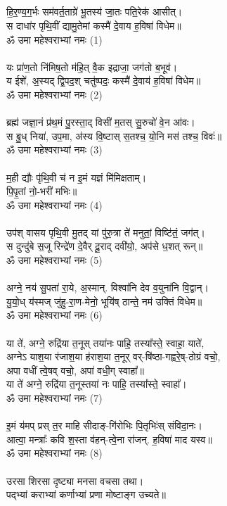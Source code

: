 \subsection{}
हि॒र॒ण्य॒ग॒र्भः सम॑वर्त॒ताग्रे॑ भू॒तस्य॑ जा॒तः पति॒रेक॑ आसीत्।\\
स दाधा॑र पृथि॒वीं द्यामु॒तेमां कस्मै॑ दे॒वाय ह॒विषा॑ विधेम॥\\
ॐ उमा महेश्वराभ्यां नमः     (1)\\
\\
यः प्रा॑ण॒तो नि॑मिष॒तो म॑हि॒त् वै॒क इद्राजा॒ जग॑तो ब॒भूव॑।\\
य ईशे॑, अ॒स्यद् द्वि॒पद॒श् चतु॑ष्पदः॒ कस्मै॑ दे॒वाय॑ ह॒विषा॑ विधेम॥\\
ॐ उमा महेश्वराभ्यां नमः     (2)\\
\\
ब्रह्म॑ जज्ञा॒नं प्र॑थ॒मं पु॒रस्ता॒द् विसी॑ म॒तस् सु॒रुचो॑ वे॒न आ॑वः।\\
स बु॒ध् निया॑, उप॒मा, अ॑स्य वि॒ष्टास् स॒तश्च॒ यो॒नि मस॑ तश्च॒ विवः॑॥\\
ॐ उमा महेश्वराभ्यां नमः     (3)\\
\\
म॒ही द्यौः पृ॑थि॒वी च॑ न इ॒मं यज्ञं मि॑मिक्षताम्।\\
पि॒पृ॒तां नो॒-भरी॑ मभिः॥\\
ॐ उमा महेश्वराभ्यां नमः     (4)\\
\\
उप॑श् वासय पृथि॒वी मु॒तद् यां पु॑रु॒त्रा ते॑ मनुतां॒ विष्टि॑तं॒ जग॑त्।\\
स दुन्दु॑बे स॒जू रिन्द्रे॑ण दे॒वैर् दू॒राद् दवी॑यो॒, अप॑से ध॒शत् रून्॥\\
ॐ उमा महेश्वराभ्यां नमः     (5)\\
\\
अग्ने॒ नय॑ सु॒पता॑ रा॒ये, अ॒स्मान्. विश्वा॑नि देव व॒युना॑नि वि॒द्वान्।\\
यु॒यो॒ध् य॑स्मज् जु॑हु-रा॒ण-मेनो॒ भूयि॑ष् ठान्ते॒ नम॑ उक्तिं विधेम॥\\
ॐ उमा महेश्वराभ्यां नमः     (6)\\
 \\
या ते॑, अग्ने॒ रुद्रि॑या त॒नूस् तया॑नः पाहि॒ तस्या᳚स्ते॒ स्वाहा॒ याते॑,\\
अग्नेऽ याश॒या र॑जाश॒या ह॑राश॒या त॒नूर् वर्-षि॑ष्ठा-गह्वरे॒ष्-ठोग्रं वचो॒,\\
अपा वधीं त्वे॒षव् वचो॒, अपा॑ वधी॒ग् स्वाहा᳚॥   \\
{\small या ते॑ अग्ने॒ रुद्रि॑या त॒नूस्तया॑ नः पाहि॒ तस्या᳚स्ते॒ स्वाहा᳚।}\\
ॐ उमा महेश्वराभ्यां नमः     (7)\\
\\
इ॒मं य॑मप् प्रस् त॒र माहि सीदाङ्-गि॑रोभिः पि॒तृभिः॑स् संविदा॒नः।\\
आत्वा॒ मन्त्राः᳚ कवि श॒स्ता व॑हन्-त्वे॒ना रा॑जन्. ह॒विषा॑ माद यस्व॥\\
ॐ उमा महेश्वराभ्यां नमः     (8)\\
\\
उरसा शिरसा दृष्ट्या मनसा वचसा तथा।\\
पद्भ्यां  कराभ्यां कर्णाभ्यां प्रणा मोष्टाङ्ग उच्यते॥\\
\\
